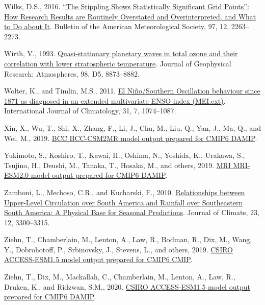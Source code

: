 \documentclass[12pt,oneside]{reedthesis}
\newlength{\cslhangindent}
\newenvironment{CSLReferences}[2] %
 {%
  \setlength{\parindent}{0pt}
  \ifodd #1 \everypar{\setlength{\hangindent}{\cslhangindent}}\ignorespaces\fi
  \ifnum #2 > 0
  \setlength{\parskip}{#2\baselineskip}
  \fi
 }%
 {}
\begin{document}
\begin{CSLReferences}{1}{0}
\leavevmode{}%
Wilks, D.S., 2016. \href{https://doi.org/10.1175/BAMS-D-15-00267.1}{{``{The Stippling Shows Statistically Significant Grid Points}''}: {How Research Results} are {Routinely Overstated} and {Overinterpreted}, and {What} to {Do} about {It}}. Bulletin of the American Meteorological Society, 97, 12, 2263--2273.

\leavevmode{}%
Wirth, V., 1993. \href{https://doi.org/10.1029/92JD02820}{Quasi-stationary planetary waves in total ozone and their correlation with lower stratospheric temperature}. Journal of Geophysical Research: Atmospheres, 98, D5, 8873--8882.

\leavevmode{}%
Wolter, K., and Timlin, M.S., 2011. \href{https://doi.org/10.1002/joc.2336}{El {Niño}/{Southern Oscillation} behaviour since 1871 as diagnosed in an extended multivariate {ENSO} index ({MEI}.ext)}. International Journal of Climatology, 31, 7, 1074--1087.

\leavevmode{}%
Xin, X., Wu, T., Shi, X., Zhang, F., Li, J., Chu, M., Liu, Q., Yan, J., Ma, Q., and Wei, M., 2019. \href{https://doi.org/10.22033/ESGF/CMIP6.1726}{BCC BCC-CSM2MR model output prepared for CMIP6 DAMIP}.

\leavevmode{}%
Yukimoto, S., Koshiro, T., Kawai, H., Oshima, N., Yoshida, K., Urakawa, S., Tsujino, H., Deushi, M., Tanaka, T., Hosaka, M., and others, 2019. \href{https://doi.org/10.22033/ESGF/CMIP6.634}{MRI MRI-ESM2.0 model output prepared for CMIP6 DAMIP}.

\leavevmode{}%
Zamboni, L., Mechoso, C.R., and Kucharski, F., 2010. \href{https://doi.org/10.1175/2009JCLI3129.1}{Relationships between {Upper-Level Circulation} over {South America} and {Rainfall} over {Southeastern South America}: {A Physical Base} for {Seasonal Predictions}}. Journal of Climate, 23, 12, 3300--3315.

\leavevmode{}%
Ziehn, T., Chamberlain, M., Lenton, A., Law, R., Bodman, R., Dix, M., Wang, Y., Dobrohotoff, P., Srbinovsky, J., Stevens, L., and others, 2019. \href{https://doi.org/10.22033/ESGF/CMIP6.2288}{CSIRO ACCESS-ESM1.5 model output prepared for CMIP6 CMIP}.

\leavevmode{}%
Ziehn, T., Dix, M., Mackallah, C., Chamberlain, M., Lenton, A., Law, R., Druken, K., and Ridzwan, S.M., 2020. \href{https://doi.org/10.22033/ESGF/CMIP6.14362}{CSIRO ACCESS-ESM1.5 model output prepared for CMIP6 DAMIP}.

\end{CSLReferences}


\end{document}

